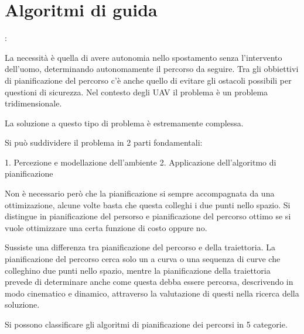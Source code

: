 \section{Algoritmi di guida}

\begin{idee}
	\cite{ElikerKaram2018AOPf}
	\cite{baseTesi}
	\cite{Mendoza-SotoJoséLuis2018Cgpc}
	\cite{PathPlannigOverview}
	
	
	\cite{YangLiang2016SoR3} : 
	
	La necessità è quella di avere autonomia nello spostamento senza l'intervento dell'uomo, determinando autonomamente il percorso da seguire.
	Tra gli obbiettivi di pianificazione del percorso c'è anche quello di evitare gli ostacoli possibili per questioni di sicurezza.
	Nel contesto degli UAV il problema è un problema tridimensionale.
	
	La soluzione a questo tipo di problema è estremamente complessa.
	
	Si può suddividere il problema in 2 parti fondamentali:
	
	1. Percezione e modellazione dell'ambiente
	2. Applicazione dell'algoritmo di pianificazione
	
	Non è necessario però che la pianificazione si sempre accompagnata da una ottimizazione, alcune volte basta che questa colleghi i due punti nello spazio.
	Si distingue in pianificazione del persorso e pianificazione del percorso ottimo se si vuole ottimizzare una certa funzione di costo oppure no.
	
	Sussiste una differenza tra pianificazione del percorso e della traiettoria. La pianificazione del percorso cerca solo un a curva o una sequenza di curve che colleghino due punti nello spazio, mentre la pianificazione della traiettoria prevede di determinare anche come questa debba essere percorsa, descrivendo in modo cinematico e dinamico, attraverso la valutazione di questi nella ricerca della soluzione.
	
	Si possono classificare gli algoritmi di pianificazione dei percorsi in 5 categorie.
	

\end{idee}
